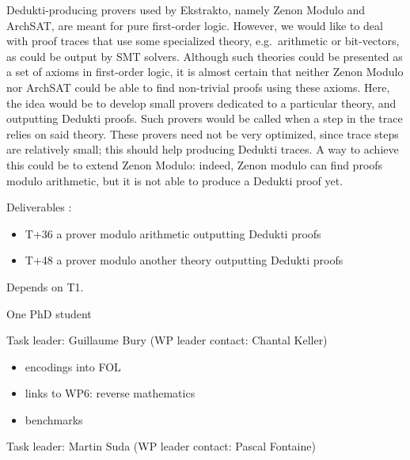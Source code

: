 \begin{workpackage}
\begin{tasklist}
\begin{task}[id=tracetodedukti, title=Translate ATP traces into Dedukti]
\begin{compactenum}
\item  Dedukti-producing provers used by Ekstrakto, namely Zenon Modulo and
  ArchSAT, are meant for pure first-order logic. However, we would like
  to deal with proof traces that use some specialized theory,
  e.g.\ arithmetic or bit-vectors, as could be output by SMT
  solvers. Although such theories could be presented as a set of axioms
  in first-order logic, it is almost certain that neither Zenon Modulo
  nor ArchSAT could be able to find non-trivial proofs using these
  axioms. Here, the idea would be to develop small provers dedicated to
  a particular theory, and outputting Dedukti proofs. Such provers would
  be called when a step in the trace relies on said theory. These
  provers need not be very optimized, since trace steps are relatively
  small; this should help producing Dedukti traces. A way to achieve
  this could be to extend Zenon Modulo: indeed, Zenon modulo can find
  proofs modulo arithmetic, but it is not able to produce a Dedukti
  proof yet.

  Deliverables :
  \begin{itemize}
  \item T+36 a prover modulo arithmetic outputting Dedukti proofs
  \item T+48 a prover modulo another theory outputting Dedukti proofs
  \end{itemize}

\end{compactenum}
  Depends on T1.

  One PhD student
  
\end{task}


\begin{task}[id=deduktitoatp, title=Translate Dedukti statements into ATPs inputs]
  Task leader: Guillaume Bury (WP leader contact: Chantal Keller)
  
\begin{itemize}
\item encodings into FOL
\item links to WP6: reverse mathematics
\item benchmarks
\end{itemize}

\end{task}


\begin{task}[id=library, title=Logipedia as a source of knowledge for ATP]
  Task leader: Martin Suda (WP leader contact: Pascal Fontaine)


\end{task}
\end{tasklist}
\end{workpackage}
